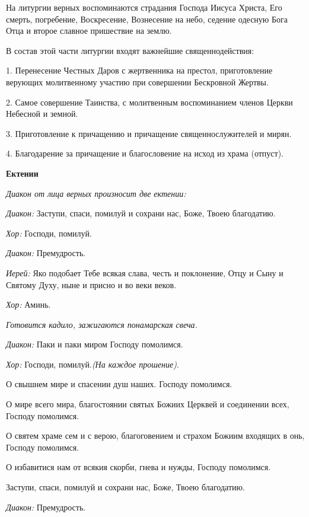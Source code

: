   На литургии верных воспоминаются страдания Господа Иисуса Христа, Его смерть, погребение, Воскресение, Вознесение на небо, седение одесную Бога Отца и второе славное пришествие на землю. 

\medskip 

В состав этой части литургии входят важнейшие священнодействия:

   1. Перенесение Честных Даров с жертвенника на престол, приготовление верующих молитвенному участию при совершении Бескровной Жертвы.

   2. Самое совершение Таинства, с молитвенным воспоминанием членов Церкви Небесной и земной. 

   3. Приготовление к причащению и причащение священнослужителей и мирян.

   4. Благодарение за причащение и благословение на исход из храма (отпуст). 

\medskip 

 {\bfseries Ектении} 

{\itshape Диакон от лица верных произносит две ектении:} 

 {\itshape  Диакон:} Заступи, спаси, помилуй и сохрани нас, Боже, Твоею благодатию.

 {\itshape Хор:} Господи, помилуй.

 {\itshape Диакон:} Премудрость.

 {\itshape  Иерей:} Яко подобает Тебе всякая слава, честь и поклонение, Отцу и Сыну и Святому Духу, ныне и присно и во веки веков.

 {\itshape  Хор:} Аминь. 

{\itshape  Готовится кадило, зажигаются понамарская свеча.} 

 {\itshape  Диакон:} Паки и паки миром Господу помолимся. 

{\itshape     Хор:} Господи, помилуй.{\itshape  (На каждое прошение)}. 

   О свышнем мире и спасении душ наших. Господу помолимся. 

   О мире всего мира, благостоянии святых Божиих Церквей и соединении всех, Господу помолимся. 

   О святем храме сем и с верою, благоговением и страхом Божиим входящих в онь, Господу помолимся. 

   О избавитися нам от всякия скорби, гнева и нужды, Господу помолимся. 

   Заступи, спаси, помилуй и сохрани нас, Боже, Твоею благодатию. 

{\itshape    Диакон:} Премудрость. 

